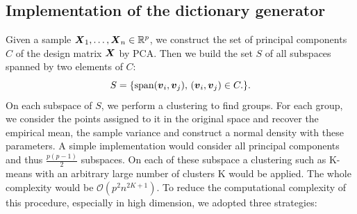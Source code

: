 \subsection{Implementation of the dictionary generator}

Given a sample $\boldsymbol X_1,\dots,\boldsymbol X_n\in{\mathbb R}^p$, we construct the set of principal components $C$ of the design matrix $\boldsymbol X$ by PCA. Then we build the set $S$ of all subspaces spanned by two elements of $C$:
\begin{equation}
  S = \{\textnormal{span}(\boldsymbol v_i,\boldsymbol v_j),\, (\boldsymbol v_i,\boldsymbol v_j) \in C.\}.
\end{equation}
On each subspace of $S$, we perform a clustering to find groups. For each group, we consider the points assigned to it in the original space and recover the empirical mean, the sample variance and construct a normal density with these parameters. A simple implementation would consider all principal components and thus $\frac{p(p-1)}{2}$ subspaces. On each of these subspace a clustering such as K-means with an arbitrary large number of clusters K would be applied. The whole complexity would be $\mathcal{O}(p^2n^{2K+1})$. To reduce the computational complexity of this procedure, especially in high dimension, we adopted three strategies:

